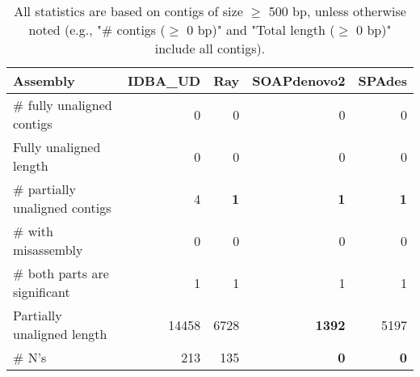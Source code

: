\documentclass[12pt,a4paper]{article}
\begin{document}
\begin{table}[ht]
\begin{center}
\caption{All statistics are based on contigs of size $\geq$ 500 bp, unless otherwise noted (e.g., "\# contigs ($\geq$ 0 bp)" and "Total length ($\geq$ 0 bp)" include all contigs).}
\begin{tabular}{|l*{4}{|r}|}
\hline
Assembly & IDBA\_UD & Ray & SOAPdenovo2 & SPAdes \\ \hline
\# fully unaligned contigs & 0 & 0 & 0 & 0 \\ \hline
Fully unaligned length & 0 & 0 & 0 & 0 \\ \hline
\# partially unaligned contigs & 4 & {\bf 1} & {\bf 1} & {\bf 1} \\ \hline
\hspace{5mm}\# with misassembly & 0 & 0 & 0 & 0 \\ \hline
\hspace{5mm}\# both parts are significant & 1 & 1 & 1 & 1 \\ \hline
Partially unaligned length & 14458 & 6728 & {\bf 1392} & 5197 \\ \hline
\# N's & 213 & 135 & {\bf 0} & {\bf 0} \\ \hline
\end{tabular}
\end{center}
\end{table}
\end{document}
